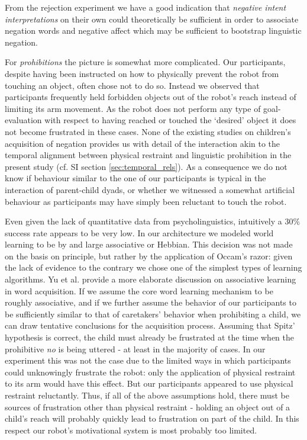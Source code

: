 \noindent From the rejection experiment we have a good indication that \emph{negative intent interpretations} on their own could theoretically be sufficient in order to
associate negation words and negative affect which may be sufficient to bootstrap linguistic negation.
 
For \emph{prohibitions} the picture is somewhat more complicated. Our participants, despite having been instructed on how to physically prevent the robot from
touching an object, often chose not to do so. Instead we observed that participants frequently held forbidden objects out of the robot's reach instead of limiting its 
arm movement. As the robot does not perform any type of goal-evaluation with respect to having reached or touched the `desired' object it does not become frustrated 
in these cases. None of the existing studies on children's
acquisition of negation provides us with detail of the interaction akin to the temporal alignment between physical restraint and linguistic prohibition in the present
study (cf. SI section \ref{sec:temporal_rels}). As a consequence we do not know if behaviour similar to the one of our participants is typical in the interaction of 
parent-child dyads, or whether we witnessed a somewhat artificial behaviour as participants may have simply been reluctant to touch the robot.

Even given the lack of quantitative data from psycholinguistics, intuitively a $30\%$ success rate appears to be very low. 
In our architecture we modeled world learning to be by and large associative or Hebbian. This decision was not made on the basis on principle, but rather by 
the application of Occam's razor: given the lack of evidence to the contrary we chose one of the simplest types of learning algorithms. Yu et al. \cite{Yu2007} provide a more 
elaborate discussion on associative learning in word acquisition. 
If we assume the core word learning mechanism to be roughly associative, and if we further assume the behavior of our participants to be sufficiently similar to that of 
caretakers' behavior when prohibiting a child, we can draw tentative conclusions for the acquisition process. Assuming that Spitz' hypothesis is correct, the child must 
already be frustrated at the time when the prohibitive \emph{no} is being uttered - at least in the majority of cases. In our experiment this was not the case due to the 
limited ways in which participants could unknowingly frustrate the robot: only the application of physical restraint to its arm would have this effect. But our participants 
appeared to use physical restraint reluctantly. Thus, if all of the above assumptions hold, there must be sources of frustration other than physical restraint - holding
an object out of a child's reach will probably quickly lead to frustration on part of the child. In this respect our robot's motivational system is most probably too limited.

